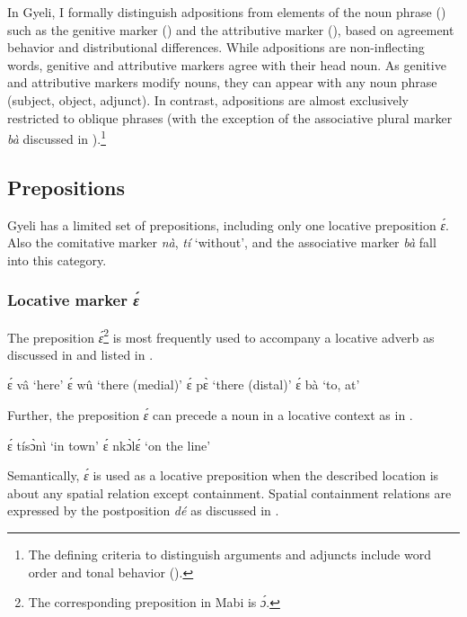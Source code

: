 In Gyeli, I formally distinguish adpositions from elements of the noun phrase () such as the genitive marker () and the attributive marker (), based on agreement behavior and distributional differences. While adpositions are non-inflecting words, genitive and attributive markers agree with their head noun. As genitive and attributive markers modify nouns, they can appear with any noun phrase (subject, object, adjunct). In contrast, adpositions are almost exclusively restricted to oblique phrases (with the exception of the associative plural marker {\itshape bà} discussed in ).\footnote{The defining criteria to distinguish arguments and adjuncts include word order and tonal behavior ().}
  






\subsection{Prepositions} 
\label{sec:PREP}

Gyeli has a limited set of prepositions, including only one locative preposition {\itshape ɛ́}. Also the comitative marker {\itshape nà}, {\itshape tí} `without', and the associative marker {\itshape bà} fall into this category.


\subsubsection{Locative marker {\itshape ɛ́}}
\label{sec:LOCe}

The preposition {\itshape ɛ́}\footnote{The corresponding preposition in Mabi is {\itshape ɔ́}.} is most frequently used to accompany a locative adverb as discussed in  and listed in .

\ea \label{eADV}
  \ea  ɛ́ vâ `here'
\ex ɛ́ wû `there (medial)'
\ex ɛ́ pɛ̀ `there (distal)'
\ex ɛ́ bà `to, at'
\z
\z

\noindent Further, the preposition {\itshape ɛ́} can precede a noun in a locative context as in .

\ea \label{eN}
  \ea  ɛ́ tísɔ̀nì `in town'
\ex ɛ́ nkɔ̀lɛ́ `on the line'
\z
\z

Semantically, {\itshape ɛ́} is used as a locative preposition when the described location is about any spatial relation except containment. Spatial containment relations are expressed by the postposition {\itshape dé} as discussed in .

